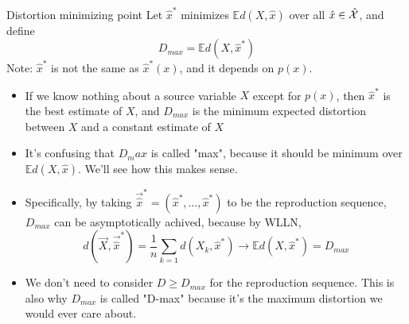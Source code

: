 \documentclass[../main.tex]{subfiles}
\begin{document}
\begin{gbox}{Distortion minimizing point}
    Let $\hat x^*$ minimizes $\mathbb E d(X,\hat x)$ over all $\hat x\in \hat {\mathcal{X}}$, and define \[
    D_{max} = \mathbb E d(X,\hat x^*)
    \]
    Note: $\hat x^*$ is not the same as $\hat x^*(x)$, and it depends on $p(x)$.
    \begin{itemize}
        \item If we know nothing about a source variable $X$ except for $p(x)$, then $\hat x^*$ is the best estimate of $X$, and $D_{max}$ is the minimum expected distortion between $X$ and a constant estimate of $X$
        \item It's confusing that $D_max$ is called "max", because it should be minimum over $\mathbb E d(X,\hat x)$. We'll see how this makes sense.
        \item Specifically, by taking $\vec{\hat x}^* = (\hat x^*,\dots,\hat x^*)$ to be the reproduction sequence, $D_{max}$ can be asymptotically achived, because by WLLN, \[
        d(\vec X, \vec{\hat x}^*) = \frac{1}{n}\sum_{k=1} d(X_k, \hat x^*) \to \mathbb E d(X,\hat x^*) = D_{max}
        \]
        \item We don't need to consider $D\geq D_{max}$ for the reproduction sequence. This is also why $D_{max}$ is called "D-max" because it's the maximum distortion we would ever care about.
    \end{itemize}
\end{gbox}
\end{document}
